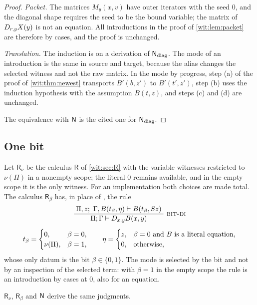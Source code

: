 \begin{proof}
\emph{Packet.}  The matrices $M_y(x,v)$ have outer iterators with the seed
$0$, and the diagonal shape requires the seed to be the bound variable; the
matrix of $D_{r,y}X(y)$ is not an equation.  All introductions in the
proof of \cref{wit:lem:packet} are therefore by cases, and the proof is
unchanged.

\emph{Translation.}  The induction is on a derivation of $\mathsf{N}_{\mathrm{diag}}$.
The mode of an introduction is the same in source and target, because the
alias changes the selected witness and not the raw matrix.  In the mode by
progress, step (a) of the proof of \cref{wit:thm:newest} transports
$B'(b,z')$ to $B'(t',z')$, step (b) uses the induction hypothesis with the
assumption $B(t,z)$, and steps (c) and (d) are unchanged.

The equivalence with $\mathsf{N}$ is the cited one for $\mathsf{N}_{\mathrm{diag}}$.
\end{proof}

\subsection{One bit}
\label{wit:sec:bit}

Let $\mathsf{R}_{\nu}$ be the calculus $\mathsf{R}$ of \cref{wit:sec:R}
with the variable witnesses restricted to $\nu(\Pi)$ in a nonempty scope;
the literal $0$ remains available, and in the empty scope it is the only
witness.  For an implementation both choices are made total.  The calculus
$\mathsf{R}_{\beta}$ has, in place of , the rule
\begin{gather*}
 \infrule{\Pi,z;\ \Gamma,B(t_\beta,\eta)\proves B(t_\beta,\Suc z)}
         {\Pi;\Gamma\proves\D{x}{y}B(x,y)}\ \rulename{Bit-DI}
 \\[1.2ex]
 t_\beta=\begin{cases}0,&\beta=0,\\ \nu(\Pi),&\beta=1,\end{cases}
 \qquad
 \eta=\begin{cases}
  z,&\beta=0\text{ and $B$ is a literal equation,}\\
  0,&\text{otherwise,}
 \end{cases}
\end{gather*}
whose only datum is the bit $\beta\in\{0,1\}$.  The mode is selected by the
bit and not by an inspection of the selected term: with $\beta=1$ in the
empty scope the rule is an introduction by cases at $0$, also for an
equation.

\begin{theorem}
\label{wit:thm:R-newest}
$\mathsf{R}_{\nu}$, $\mathsf{R}_{\beta}$ and $\mathsf{N}$ derive the same
judgments.
\end{theorem}

